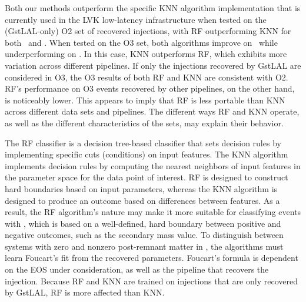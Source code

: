 Both our methods outperform the specific \ac{KNN} algorithm implementation that is currently used in the \ac{LVK} low-latency infrastructure when tested on the (GstLAL-only) \ac{O2} set
of recovered injections, with \ac{RF} outperforming \ac{KNN} for both \hasns\ and \hasrem. When tested on the \ac{O3} set, both algorithms improve on \hasns\ while underperforming on
\hasrem.  In this case, \ac{KNN} outperforms \ac{RF}, which exhibits more variation across different pipelines.  If only the injections recovered by GstLAL are considered in \ac{O3}, the
\ac{O3} results of both \ac{RF} and \ac{KNN} are consistent with \ac{O2}. \ac{RF}'s performance on \ac{O3} events recovered by other pipelines, on the other hand, is noticeably lower.
This appears to imply that \ac{RF} is less portable than \ac{KNN} across different data sets and pipelines. The different ways \ac{RF} and \ac{KNN} operate, as well as the different
characteristics of the sets, may explain their behavior.

The RF classifier is a decision tree-based classifier that sets decision rules by implementing specific cuts (conditions) on input features. The \ac{KNN} algorithm implements decision
rules by computing the nearest neighbors of input features in the parameter space for the data point of interest. \ac{RF} is designed to construct hard boundaries based on input
parameters, whereas the \ac{KNN} algorithm is designed to produce an outcome based on differences between features. As a result, the \ac{RF} algorithm's nature may make it more suitable
for classifying events with \hasns, which is based on a well-defined, hard boundary between positive and negative outcomes, such as the secondary mass value. To distinguish between
systems with zero and nonzero post-remnant matter in \hasrem, the algorithms must learn Foucart's fit from the recovered parameters. Foucart's formula is dependent on the \ac{EOS} under
consideration, as well as the pipeline that recovers the injection. Because \ac{RF} and \ac{KNN} are trained on injections that are only recovered by GstLAL, \ac{RF} is more affected than
\ac{KNN}. 

